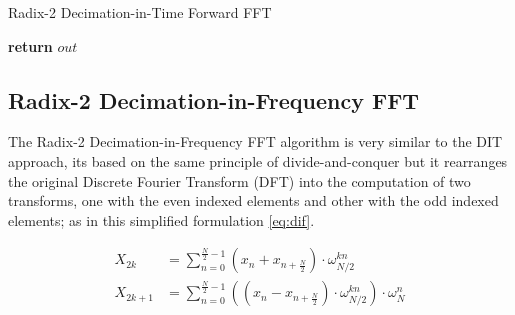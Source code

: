 \documentclass[
  oneside,
  11pt, a4paper,
  footinclude=true,
  headinclude=true,
  cleardoublepage=empty
]{scrbook}
\begin{document}
\begin{algorithm}[H]
    \caption{Radix-2 Decimation-in-Time Forward FFT} \label{alg:dit}


    \textbf{return} $out$\;
\end{algorithm}



\subsection{Radix-2 Decimation-in-Frequency FFT} \label{subsec:radix-2-dif} \label{subsec:radix-2-decimation-in-frequency-fft}

The Radix-2 Decimation-in-Frequency FFT algorithm is very similar to the DIT approach, its based on the same principle of divide-and-conquer but it rearranges the original Discrete Fourier Transform (DFT) into the computation of two transforms, one with the even indexed elements and other with the odd indexed elements; as in this simplified formulation \autoref{eq:dif}.

\begin{equation} \label{eq:dif}
    \begin{aligned}
        X_{2k} &= \sum_{n=0}^{\frac{N}{2}-1} (x_{n} + x_{n + \frac{N}{2}}) \cdot \omega_{N/2}^{kn} \\
        X_{2k+1} &= \sum_{n=0}^{\frac{N}{2}-1} ((x_{n} - x_{n + \frac{N}{2}}) \cdot \omega_{N/2}^{kn}) \cdot \omega_{N}^{n} \\
    \end{aligned}
\end{equation}
\end{document}
